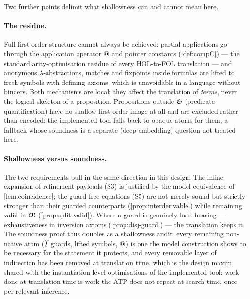 Two further points delimit what shallowness can and cannot mean here.

\paragraph{The residue.}  Full first-order structure cannot always be
achieved: partial applications go through the application operator
$\mathbin{@}$ and pointer constants (\cref{def:compC}) --- the standard
arity-optimisation residue of every HOL-to-FOL translation
\cite{MengPaulson2008} --- and anonymous $\lambda$-abstractions, matches
and fixpoints inside formulas are lifted to fresh symbols with defining
axioms, which is unavoidable in a language without binders.  Both
mechanisms are local: they affect the translation of \emph{terms}, never
the logical skeleton of a proposition.  Propositions outside $\mathfrak{S}$
(predicate quantification) have no shallow first-order image at all and
are excluded rather than encoded; the implemented tool falls back to
opaque atoms for them, a fallback whose soundness is a separate
(deep-embedding) question not treated here.

\paragraph{Shallowness versus soundness.}  The two requirements pull in
the same direction in this design.  The inline expansion of refinement
payloads (S3) is justified by the model equivalence of
\cref{lem:coincidence}; the guard-free equations (S5) are not merely
sound but strictly stronger than their guarded counterparts
(\cref{prop:interderivable}) while remaining valid in $\mathfrak{M}$
(\cref{prop:split-valid}).  Where a guard is genuinely load-bearing ---
exhaustiveness in inversion axioms (\cref{prop:disj-guard}) --- the
translation keeps it.  The soundness proof thus doubles as a shallowness
audit: every remaining non-native atom ($\widehat{I}$ guards, lifted
symbols, $\mathbin{@}$) is one the model construction shows to be necessary
for the statement it protects, and every removable layer of indirection
has been removed at translation time, which is the design maxim shared
with the instantiation-level optimisations of the implemented tool: work
done at translation time is work the ATP does not repeat at search time,
once per relevant inference.

